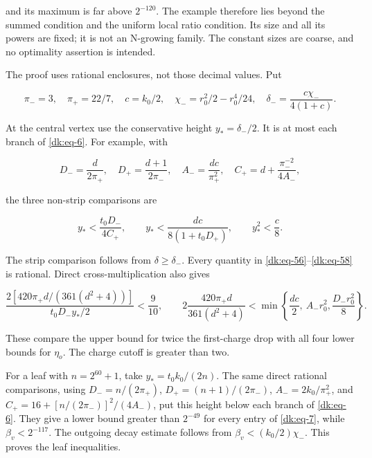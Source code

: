 and its maximum is far above \(2^{-120}\). The example therefore lies beyond
the summed condition and the uniform local ratio condition. Its size and all its powers
are fixed; it is not an N-growing family. The constant sizes are coarse,
and no optimality assertion is intended.

The proof uses rational enclosures, not those decimal values. Put

\begin{equation}\label{dk:eq-56}
\pi_- =3,\quad \pi_+=22/7,\quad c=k_0/2,\quad
 \chi_-=r_0^2/2-r_0^4/24,\quad
 \delta_- =\frac{c\chi_-}{4(1+c)}.
\end{equation}

At the central vertex use the conservative height
\(y_* =\delta_-/2\). It is at most each branch of \eqref{dk:eq-6}. For example,
with

\begin{equation}\label{dk:eq-57}
D_- =\frac d{2\pi_+},\quad D_+=\frac{d+1}{2\pi_-},\quad
 A_- =\frac{dc}{\pi_+^2},\quad
 C_+=d+\frac{\pi_-^{-2}}{4A_-},
\end{equation}

the three non-strip comparisons are

\begin{equation}\label{dk:eq-58}
y_*<\frac{t_0D_-}{4C_+},\qquad
 y_*<\frac{dc}{8(1+t_0D_+)},\qquad y_*^2<\frac c8.
\end{equation}

The strip comparison follows from \(\delta\ge\delta_-\).
Every quantity in \eqref{dk:eq-56}--\eqref{dk:eq-58} is rational. Direct cross-multiplication
also gives

\begin{equation}\label{dk:eq-59}
\frac{2[420\pi_+d/(361(d^2+4))]}
             {t_0D_-y_*/2}<\frac9{10},
 \qquad
 2\frac{420\pi_+d}{361(d^2+4)}
 <\min\left\{\frac{dc}{2},\ A_-r_0^2,
                          \frac{D_-r_0^2}{8}\right\}.
\end{equation}

These compare the upper bound for twice the first-charge drop with
all four lower bounds for \(\eta_o\). The charge cutoff is greater
than two.

For a leaf with \(n=2^{60}+1\), take
\(y_*=t_0k_0/(2n)\). The same direct rational comparisons, using
\(D_-=n/(2\pi_+)\), \(D_+=(n+1)/(2\pi_-)\),
\(A_-=2k_0/\pi_+^2\), and
\(C_+=16+[n/(2\pi_-)]^2/(4A_-)\), put this height below each
branch of \eqref{dk:eq-6}. They give a lower bound greater than \(2^{-49}\)
for every entry of \eqref{dk:eq-7}, while \(\beta_v<2^{-117}\).
The outgoing decay estimate follows from
\(\beta_v<(k_0/2)\chi_-\). This proves the leaf inequalities.

